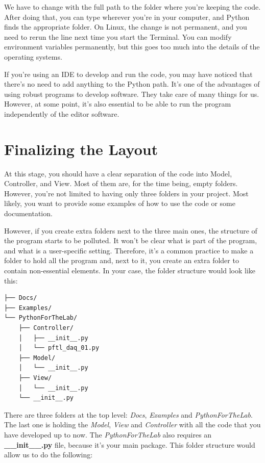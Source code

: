 We have to change  with the full path to the folder where you're keeping the code. After doing that, you can type  wherever you're in your computer, and Python finds the appropriate folder. On Linux, the change is not permanent, and you need to rerun the line next time you start the Terminal. You can modify environment variables permanently, but this goes too much into the details of the operating systems.

If you're using an IDE to develop and run the code, you may have noticed that there's no need to add anything to the Python path. It's one of the advantages of using robust programs to develop software. They take care of many things for us. However, at some point, it's also essential to be able to run the program independently of the editor software.

\section{Finalizing the Layout}\label{sec:final-layout}
At this stage, you should have a clear separation of the code into Model, Controller, and View. Most of them are, for the time being, empty folders. However, you're not limited to having only three folders in your project. Most likely, you want to provide some examples of how to use the code or some documentation.

However, if you create extra folders next to the three main ones, the structure of the program starts to be polluted. It won't be clear what is part of the program, and what is a user-specific setting. Therefore, it's a common practice to make a folder to hold all the program and, next to it, you create an extra folder to contain non-essential elements. In your case, the folder structure would look like this:

\begin{verbatim}
├── Docs/
├── Examples/
└── PythonForTheLab/
    ├── Controller/
    │   ├── __init__.py
    │   └── pftl_daq_01.py
    ├── Model/
    │   └── __init__.py
    ├── View/
    │   └── __init__.py
    └── __init__.py
\end{verbatim}

There are three folders at the top level: \emph{Docs}, \emph{Examples} and \emph{PythonForTheLab}. The last one is holding the \emph{Model}, \emph{View} and \emph{Controller} with all the code that you have developed up to now. The \emph{PythonForTheLab} also requires an \textbf{\_\_init\_\_.py} file, because it's your main package. This folder structure would allow us to do the following:

